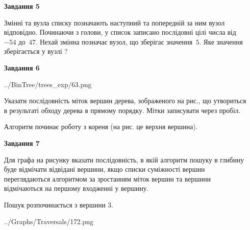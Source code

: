 \documentclass[12pt, ukrainian]{article}
\begin{document}
{\begin {large}
{\begin {center}\textbf{Завдання 5}\end {center}}\par
Змінні  та  вузла списку позначають наступний та попередній за ним вузол відповідно. Починаючи з голови, у список записано послідовні цілі числа від~$-54$ до~$47$. Нехай змінна  позначає вузол, що зберігає значення~$5$.
Яке значення зберігається у вузлі  ?\par
\newpage

{\begin {center}\textbf{Завдання 6}\end {center}}\par

\begin{center}
	{../BinTree/trees_exp/63.png}
\end{center}
Указати послідовність міток вершин дерева, зображеного на рис., що утвориться в результаті обходу дерева в прямому порядку. Мітки записувати через пробіл.\par Алгоритм починає роботу з кореня (на рис. це верхня вершина).\par
\newpage

{\begin {center}\textbf{Завдання 7}\end {center}}\par
Для графа на рисунку вказати послідовність, в якій алгоритм пошуку в глибину буде відмічати відвідані вершини, якщо списки суміжності вершин переглядаються алгоритмом за зростанням міток вершин та вершини відмічаються на першому вход\-женні у вершину.\par
Пошук розпочинається з вершини 3.\par

\begin{center}
	{../Graphs/Traversals/172.png}
\end{center}\par
\newpage


\end{large}}
\end{document}
